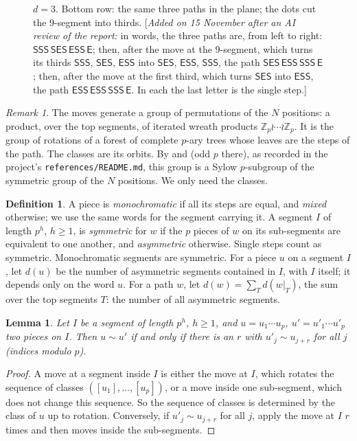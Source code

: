 \documentclass[11pt]{article}
\newtheorem{lemma}[theorem]{Lemma}
\theoremstyle{definition}
\newtheorem{definition}[theorem]{Definition}
\theoremstyle{remark}
\newtheorem{remark}[theorem]{Remark}
\numberwithin{equation}{section}
\numberwithin{figure}{section}
\newcommand{\E}{\textsf{E}}
\newcommand{\Ss}{\textsf{S}}
\newcommand{\revnote}[1]{[\emph{Added on 15 November after an AI review of the report:} #1]}
\begin{document}
\begin{figure}[ht]
{$d=3$. Bottom row: the same three paths in the plane; the dots cut the $9$-segment into thirds.
\revnote{in words, the three paths are, from left to right: $\Ss\Ss\Ss\,\Ss\E\Ss\,\E\Ss\Ss\,\E$; then, after
the move at the $9$-segment, which turns its thirds $\Ss\Ss\Ss$, $\Ss\E\Ss$, $\E\Ss\Ss$ into $\Ss\E\Ss$,
$\E\Ss\Ss$, $\Ss\Ss\Ss$, the path $\Ss\E\Ss\,\E\Ss\Ss\,\Ss\Ss\Ss\,\E$; then, after the move at the first
third, which turns $\Ss\E\Ss$ into $\E\Ss\Ss$, the path $\E\Ss\Ss\,\E\Ss\Ss\,\Ss\Ss\Ss\,\E$. In each the last
letter is the single step.}}
\label{path:fig:moves}
\end{figure}

\begin{remark}
The moves generate a group of permutations of the $N$ positions: a product, over the top segments, of
iterated wreath products $\mathbb Z_p\wr\cdots\wr\mathbb Z_p$. It is the group of rotations of a forest of complete $p$-ary
trees whose leaves are the steps of the path. The classes are its orbits. By \cite[p.~239]{Kaloujnine} and
\cite[Section~2]{GiannelliLaw} (odd $p$ there), as recorded in the project's \texttt{references/README.md}, this group is a Sylow
$p$-subgroup of the symmetric group of the $N$ positions. We only need the classes.
\end{remark}

\begin{definition}\label{path:def:sym}
A piece is \emph{monochromatic} if all its steps are equal, and \emph{mixed} otherwise; we use the same words
for the segment carrying it. A segment $I$ of length $p^h$, $h\ge1$, is \emph{symmetric} for $w$ if the $p$
pieces of $w$ on its sub-segments are equivalent to one another, and \emph{asymmetric} otherwise. Single
steps count as symmetric. Monochromatic segments are symmetric. For a piece $u$ on a segment $I$, let $d(u)$ be the number of asymmetric segments contained in $I$, with $I$
itself; it depends only on the word $u$. For a path $w$, let $d(w)=\sum_Td(w|_T)$, the sum over the top segments
$T$: the number of all asymmetric segments.
\end{definition}

\begin{lemma}\label{path:lem:classes}
Let $I$ be a segment of length $p^h$, $h\ge 1$, and $u=u_1\cdots u_p$, $u'=u'_1\cdots u'_p$ two pieces on $I$.
Then $u\sim u'$ if and only if there is an $r$ with $u'_j\sim u_{j+r}$ for all $j$ (indices modulo $p$).
\end{lemma}
\begin{proof}
A move at a segment inside $I$ is either the move at $I$, which rotates the sequence of classes
$([u_1],\dots,[u_p])$, or a move inside one sub-segment, which does not change this sequence. So the
sequence of classes is determined by the class of $u$ up to rotation. Conversely, if $u'_j\sim u_{j+r}$ for all
$j$, apply the move at $I$ $r$ times and then moves inside the sub-segments.
\end{proof}
\end{document}
